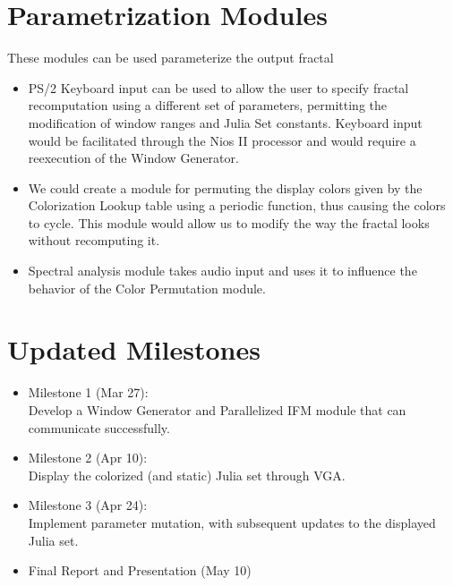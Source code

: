 \documentclass{article}
\begin{document}
\section{Parametrization Modules}

These modules can be used parameterize the output fractal

\begin{itemize}
\item PS/2 Keyboard input can be used to allow the user to specify fractal recomputation using a different set of parameters, permitting the modification of window ranges and Julia Set constants. Keyboard input would be facilitated through the Nios II processor and would require a reexecution of the Window Generator.
\item We could create a module for permuting the display colors given by the  Colorization Lookup table using a periodic function, thus causing the colors to cycle. This module would allow us to modify the way the fractal looks without recomputing it.
\item Spectral analysis module takes audio input and uses it to influence the behavior of the Color Permutation module.
\end{itemize}


\section{Updated Milestones}

\begin{itemize}
\item Milestone 1 (Mar 27): \\
  Develop a Window Generator and Parallelized IFM module that can communicate successfully.   
\item Milestone 2 (Apr 10): \\
  Display the colorized (and static) Julia set through VGA.
\item Milestone 3 (Apr 24): \\ 
  Implement parameter mutation, with subsequent updates to the
  displayed Julia set.
\item Final Report and Presentation (May 10)
\end{itemize}
\end{document}
